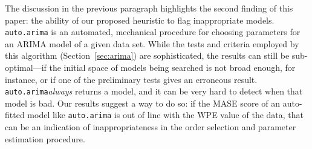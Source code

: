 \documentclass[%
pre,
reprint,
superscriptaddress,
showpacs,
nofootinbib,
nobibnotes,
 amsmath,amssymb,
 aps,
]{revtex4-1}
\newcommand{\arima}{{\tt auto.arima}\xspace}
\newcommand{\col}{{\tt col\_major}\xspace}
\begin{document}
The discussion in the previous paragraph highlights the second finding
of this paper: the ability of our proposed heuristic to flag
inappropriate models.  \arima is an automated, mechanical procedure
for choosing parameters for an ARIMA model of a given data set.  While
the tests and criteria employed by this algorithm
(Section~\ref{sec:arima}) are sophisticated, the results can still be
sub-optimal---if the initial space of models being searched is not
broad enough, for instance, or if one of the preliminary tests gives
an erroneous result.  \arima \emph{always} returns a model, and it can
be very hard to detect when that model is bad.  Our results suggest a
way to do so: if the MASE score of an auto-fitted model like \arima is
out of line with the WPE value of the data, that can be an indication
of inappropriateness in the order selection and parameter estimation
procedure.  

\end{document}
